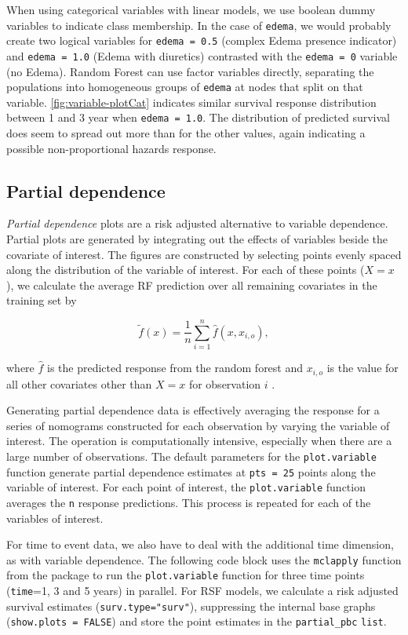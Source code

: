 \documentclass[article]{jss}
\begin{document}
When using categorical variables with linear models, we use boolean
dummy variables to indicate class membership. In the case of
\texttt{edema}, we would probably create two logical variables for
\texttt{edema\ =\ 0.5} (complex Edema presence indicator) and
\texttt{edema\ =\ 1.0} (Edema with diuretics) contrasted with the
\texttt{edema\ =\ 0} variable (no Edema). Random Forest can use factor
variables directly, separating the populations into homogeneous groups
of \texttt{edema} at nodes that split on that variable.
\autoref{fig:variable-plotCat} indicates similar survival response
distribution between 1 and 3 year when \texttt{edema\ =\ 1.0}. The
distribution of predicted survival does seem to spread out more than for
the other values, again indicating a possible non-proportional hazards
response.

\subsection{Partial dependence}\label{partial-dependence}

\emph{Partial dependence} plots are a risk adjusted alternative to
variable dependence. Partial plots are generated by integrating out the
effects of variables beside the covariate of interest. The figures are
constructed by selecting points evenly spaced along the distribution of
the variable of interest. For each of these points (\(X = x\)), we
calculate the average RF prediction over all remaining covariates in the
training set by

\[
\tilde{f}(x) = \frac{1}{n} \sum_{i = 1}^n \hat{f}(x, x_{i, o}),
\label{E:partial}
\]

where \(\hat{f}\) is the predicted response from the random forest and
\(x_{i, o}\) is the value for all other covariates other than \(X = x\)
for observation \(i\) \citep{Friedman:2000}.

Generating partial dependence data is effectively averaging the response
for a series of nomograms constructed for each observation by varying
the variable of interest. The operation is computationally intensive,
especially when there are a large number of observations. The default
parameters for the \texttt{plot.variable} function generate partial
dependence estimates at \texttt{pts\ =\ 25} points along the variable of
interest. For each point of interest, the \texttt{plot.variable}
function averages the \texttt{n} response predictions. This process is
repeated for each of the variables of interest.

For time to event data, we also have to deal with the additional time
dimension, as with variable dependence. The following code block uses
the \texttt{mclapply} function from the  package to run
the \texttt{plot.variable} function for three time points
(\texttt{time}=1, 3 and 5 years) in parallel. For RSF models, we
calculate a risk adjusted survival estimates
(\texttt{surv.type="surv"}), suppressing the internal base graphs
(\texttt{show.plots\ =\ FALSE}) and store the point estimates in the
\texttt{partial\_pbc} \texttt{list}.
\end{document}
